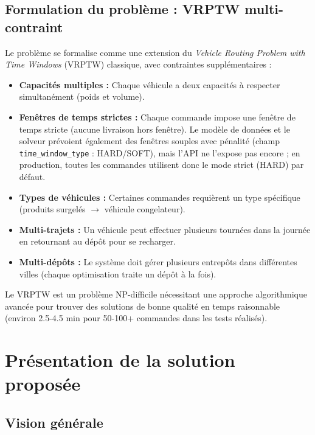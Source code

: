 \documentclass[12pt,a4paper]{report}
\begin{document}
\subsection{Formulation du problème : VRPTW multi-contraint}

Le problème se formalise comme une extension du \textit{Vehicle Routing Problem with Time Windows} (VRPTW) classique, avec contraintes supplémentaires :

\begin{itemize}[leftmargin=2.2em]
    \item \textbf{Capacités multiples :} Chaque véhicule a deux capacités à respecter simultanément (poids et volume).

    \item \textbf{Fenêtres de temps strictes :} Chaque commande impose une fenêtre de temps stricte (aucune livraison hors fenêtre). Le modèle de données et le solveur prévoient également des fenêtres souples avec pénalité (champ \texttt{time\_window\_type} : HARD/SOFT), mais l'API ne l'expose pas encore ; en production, toutes les commandes utilisent donc le mode strict (HARD) par défaut.

    \item \textbf{Types de véhicules :} Certaines commandes requièrent un type spécifique (produits surgelés $\rightarrow$ véhicule congelateur).

    \item \textbf{Multi-trajets :} Un véhicule peut effectuer plusieurs tournées dans la journée en retournant au dépôt pour se recharger.

    \item \textbf{Multi-dépôts :} Le système doit gérer plusieurs entrepôts dans différentes villes (chaque optimisation traite un dépôt à la fois).
\end{itemize}

Le VRPTW est un problème NP-difficile nécessitant une approche algorithmique avancée pour trouver des solutions de bonne qualité en temps raisonnable (environ 2.5-4.5 min pour 50-100+ commandes dans les tests réalisés).


\section{Présentation de la solution proposée}

\subsection{Vision générale}
\end{document}
